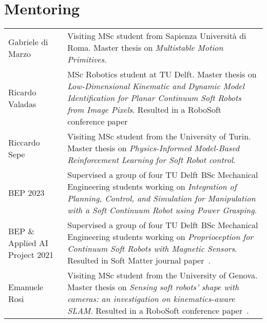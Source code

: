 \section*{Mentoring}
\noindent
\begin{longtable}{p{} p{}}
    Gabriele di Marzo & Visiting MSc student from Sapienza Università di Roma. Master thesis on \emph{Multistable Motion Primitives}.\\
    Ricardo Valadas & MSc Robotics student at TU Delft. Master thesis on \emph{Low-Dimensional Kinematic and Dynamic Model Identification for Planar Continuum Soft Robots from Image Pixels}. Resulted in a RoboSoft conference paper~\citep{valadas2025learning}\\
    Riccardo Sepe & Visiting MSc student from the University of Turin. Master thesis on \emph{Physics-Informed Model-Based Reinforcement Learning for Soft Robot control}.\\
    BEP 2023 & Supervised a group of four TU Delft BSc Mechanical Engineering students working on \emph{Integration of Planning, Control, and Simulation for Manipulation with a Soft Continuum Robot using Power Grasping}.\\
    BEP \& Applied AI Project 2021 & Supervised a group of four TU Delft BSc Mechanical Engineering students working on \emph{Proprioception for Continuum Soft Robots with Magnetic Sensors}. Resulted in Soft Matter journal paper~\citep{baaij2023learning}.\\
    Emanuele Rosi & Visiting MSc student from the University of Genova. Master thesis on \emph{Sensing soft robots' shape with cameras: an investigation on kinematics-aware SLAM}. Resulted in a RoboSoft conference paper~\citep{rosi2022sensing}.\\
\end{longtable}

